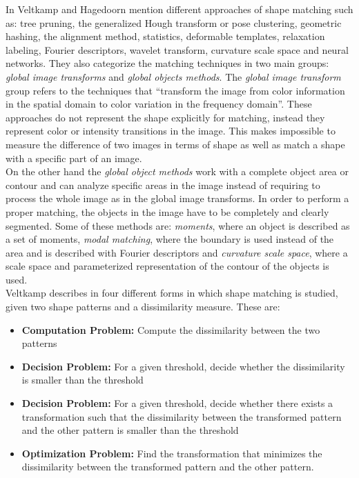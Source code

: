 In \cite{matchingbook} Veltkamp and Hagedoorn mention different 
approaches of shape matching such as: tree pruning, the
generalized Hough transform or pose clustering, geometric hashing,
the alignment method, statistics, deformable templates, relaxation
labeling, Fourier descriptors, wavelet transform, curvature
scale space and neural networks.
They also categorize the matching techniques in two main groups:
\emph{global image transforms} and \emph{global objects methods}.
The \emph{global image transform} group refers to the techniques that
``transform the image from color information in the spatial
domain to color variation in the frequency domain''. 
These approaches do not represent the shape explicitly for 
matching, instead they represent color or intensity transitions 
in the image. This makes impossible to measure the difference of 
two images in terms of shape as well as match a shape with a 
specific part of an image.\\
On the other hand the \emph{global object methods} work with a complete
object area or contour and can analyze specific areas in the 
image instead of requiring to process the whole image as in 
the global image transforms. In order to perform a proper
matching, the objects in the image have to be completely and
clearly segmented. Some of these methods are: \emph{moments}, where an
object is described as a set of moments, \emph{modal matching},
where the boundary is used instead of the area and is described 
with Fourier descriptors and \emph{curvature scale space}, where a
scale space and parameterized representation of the contour of the 
objects is used.\\

Veltkamp describes in \cite{matching2} four different forms in
which shape matching is studied, given two shape patterns
and a dissimilarity measure. These are:

\begin{itemize}
\item \textbf{Computation Problem: }Compute the dissimilarity
  between the two patterns
\item \textbf{Decision Problem: }For a given threshold, decide
  whether the dissimilarity is smaller than the threshold
\item \textbf{Decision Problem: }For a given threshold, decide
  whether there exists a transformation such that the
dissimilarity between the transformed pattern and the other 
pattern is smaller than the threshold
\item \textbf{Optimization Problem: }Find the transformation
that minimizes the dissimilarity between the transformed
pattern and the other pattern.
\end{itemize}

